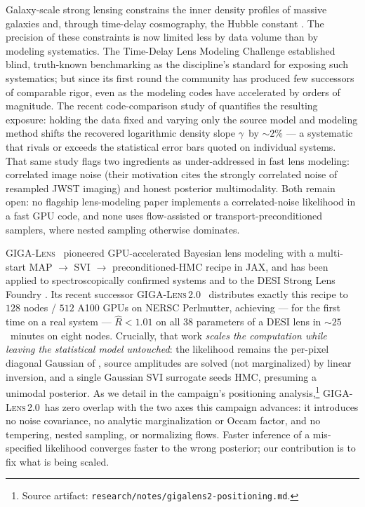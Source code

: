 \documentclass[11pt,letterpaper]{article}
\newcommand{\gammaEPL}{\ensuremath{\gamma}}
\newcommand{\Rhat}{\ensuremath{\hat{R}}}
\newcommand{\gigalens}{\textsc{GIGA-Lens}}
\newcommand{\gigalenstwo}{\textsc{GIGA-Lens\,2.0}}
\newcommand{\art}[1]{\footnote{Source artifact: \texttt{#1}.}}
\begin{document}
Galaxy-scale strong lensing constrains the inner density profiles of massive
galaxies and, through time-delay cosmography, the Hubble constant
\citep{treu2010annurev,tdcosmo4}. The precision of these constraints is now
limited less by data volume than by modeling systematics. The Time-Delay Lens
Modeling Challenge \citep{tdlmc2018,tdlmc2020results} established blind,
truth-known benchmarking as the discipline's standard for exposing such
systematics; but since its first round the community has produced few
successors of comparable rigor, even as the modeling codes have accelerated
by orders of magnitude. The recent code-comparison study of
\citet{etherington2024codecomparison} quantifies the resulting exposure:
holding the data fixed and varying only the source model and modeling method
shifts the recovered logarithmic density slope \gammaEPL\ by $\sim$$2\%$ ---
a systematic that rivals or exceeds the statistical error bars quoted on
individual systems. That same study flags two ingredients as under-addressed
in fast lens modeling: correlated image noise (their motivation cites the
strongly correlated noise of resampled JWST imaging) and honest posterior
multimodality. Both remain open: no flagship lens-modeling paper implements a
correlated-noise likelihood in a fast GPU code, and none uses flow-assisted or
transport-preconditioned samplers, where nested sampling
\citep{lange2023nautilus} otherwise dominates.

\gigalens\ \citep{gu2022gigalens} pioneered GPU-accelerated Bayesian lens
modeling with a multi-start MAP $\to$ SVI $\to$ preconditioned-HMC recipe in
JAX, and has been applied to spectroscopically confirmed systems
\citep{cikota2023einsteincross,sheu2024carousel} and to the DESI Strong Lens
Foundry \citep{huang2025foundry1}. Its recent successor \gigalenstwo\
\citep{huang2026gigalens2} distributes exactly this recipe to $128$ nodes /
$512$ A100 GPUs on NERSC Perlmutter, achieving --- for the first time on a
real system --- $\Rhat<1.01$ on all $38$ parameters of a DESI lens in
$\sim$$25$~minutes on eight nodes. Crucially, that work {\it scales the
computation while leaving the statistical model untouched}: the likelihood
remains the per-pixel diagonal Gaussian of \citet{gu2022gigalens}, source
amplitudes are solved (not marginalized) by linear inversion, and a single
Gaussian SVI surrogate seeds HMC, presuming a unimodal posterior. As we detail
in the campaign's positioning analysis,\art{research/notes/gigalens2-positioning.md}
\gigalenstwo\ has zero overlap with the two axes this campaign advances: it
introduces no noise covariance, no analytic marginalization or Occam factor,
and no tempering, nested sampling, or normalizing flows. Faster inference of
a mis-specified likelihood converges faster to the wrong posterior; our
contribution is to fix what is being scaled.
\end{document}
